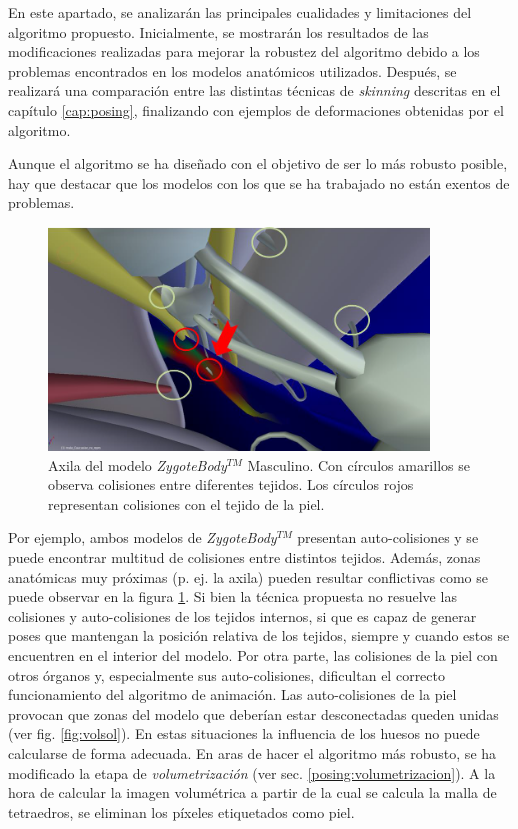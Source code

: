 En este apartado, se analizarán las principales cualidades y limitaciones del algoritmo propuesto. Inicialmente, se mostrarán los resultados de las modificaciones realizadas para mejorar la robustez del algoritmo debido a los problemas encontrados en los modelos anatómicos utilizados. Después, se realizará una comparación entre las distintas técnicas de \emph{skinning} descritas en el capítulo \ref{cap:posing}, finalizando con ejemplos de deformaciones obtenidas por el algoritmo.


Aunque el algoritmo se ha diseñado con el objetivo de ser lo más robusto posible, hay que destacar que los modelos con los que se ha trabajado no están exentos de problemas. 
\begin{figure}[ht]
   \centering
    \includegraphics[width=0.9\textwidth]{IMG/zygoteproblems.png}
    \caption{Axila del modelo \emph{ZygoteBody}$^{TM}$ Masculino. Con círculos amarillos se observa colisiones entre diferentes tejidos. Los círculos rojos representan colisiones con el tejido de la piel.}
   \label{fig:zygoteproblems}
\end{figure}
Por ejemplo, ambos modelos de \emph{ZygoteBody}$^{TM}$ presentan auto-colisiones y se puede encontrar multitud de colisiones entre distintos tejidos. Además, zonas anatómicas muy próximas (p. ej. la axila) pueden resultar conflictivas como se puede observar en la figura \ref{fig:zygoteproblems}. Si bien la técnica propuesta no resuelve las colisiones y auto-colisiones de los tejidos internos, si que es capaz de generar poses que mantengan la posición relativa de los tejidos, siempre y cuando estos se encuentren en el interior del modelo. Por otra parte, las colisiones de la piel con otros órganos y, especialmente sus auto-colisiones, dificultan el correcto funcionamiento del algoritmo de animación. Las auto-colisiones de la piel provocan que zonas del modelo que deberían estar desconectadas queden unidas (ver fig. \ref{fig:volsol}). En estas situaciones la influencia de los huesos no puede calcularse de forma adecuada. En aras de hacer el algoritmo más robusto, se ha modificado la etapa de \emph{volumetrización} (ver sec. \ref{posing:volumetrizacion}). A la hora de calcular la imagen volumétrica a partir de la cual se calcula la malla de tetraedros, se eliminan los píxeles etiquetados como piel.

